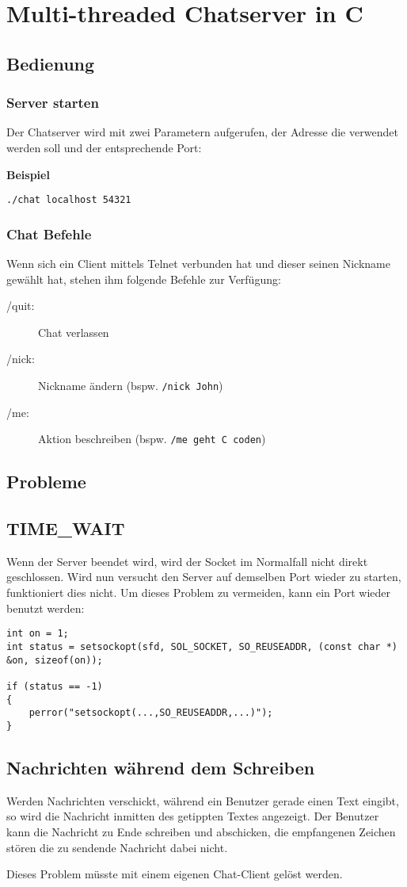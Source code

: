 \documentclass[11pt,a4paper]{article}
\begin{document}
\section{Multi-threaded Chatserver in C}
\subsection{Bedienung}
\subsubsection{Server starten}
Der Chatserver wird mit zwei Parametern aufgerufen, der Adresse die verwendet werden soll und der entsprechende Port:

\begin{flushleft}
\textbf{Beispiel}

\texttt{./chat localhost 54321}
\end{flushleft}

\subsubsection{Chat Befehle}
Wenn sich ein Client mittels Telnet verbunden hat und dieser seinen Nickname gewählt hat, stehen ihm folgende Befehle zur Verfügung:
\begin{description}
    \item[/quit:] Chat verlassen
    \item[/nick:] Nickname ändern (bspw. \texttt{/nick John})
    \item[/me:] Aktion beschreiben (bspw. \texttt{/me geht C coden})
\end{description}

\subsection{Probleme}
\subsection{TIME\_WAIT}
Wenn der Server beendet wird, wird der Socket im Normalfall nicht direkt geschlossen. Wird nun versucht den Server auf demselben Port wieder zu starten, funktioniert dies nicht. Um dieses Problem zu vermeiden, kann ein Port wieder benutzt werden:

\begin{verbatim}
int on = 1;
int status = setsockopt(sfd, SOL_SOCKET, SO_REUSEADDR, (const char *) 
&on, sizeof(on));

if (status == -1) 
{   
    perror("setsockopt(...,SO_REUSEADDR,...)");
}
\end{verbatim}

\subsection{Nachrichten während dem Schreiben}
Werden Nachrichten verschickt, während ein Benutzer gerade einen Text eingibt, so wird die Nachricht inmitten des getippten Textes angezeigt. Der Benutzer kann die Nachricht zu Ende schreiben und abschicken, die empfangenen Zeichen stören die zu sendende Nachricht dabei nicht.

Dieses Problem müsste mit einem eigenen Chat-Client gelöst werden.
\end{document}
